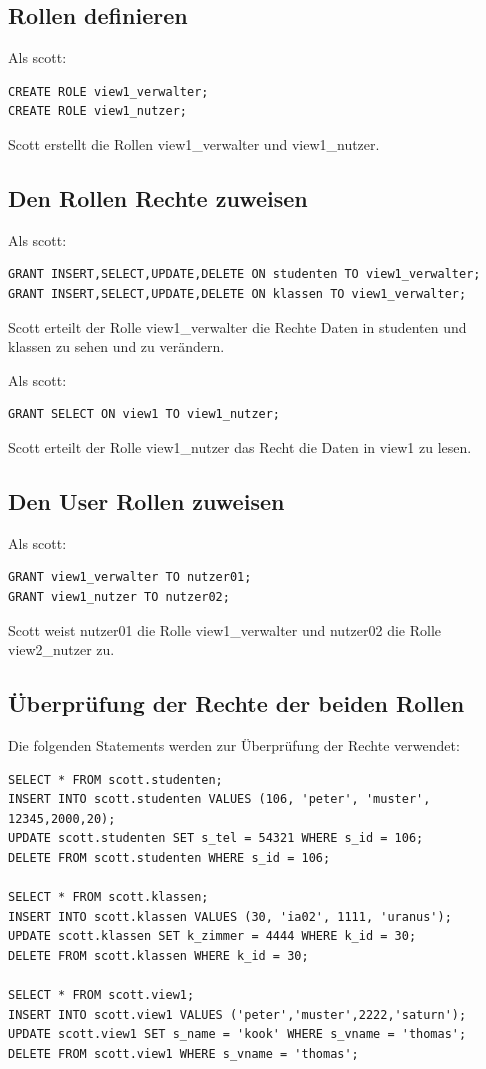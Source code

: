 \documentclass[10pt]{scrreprt}
\begin{document}
\subsection{Rollen definieren}
Als scott:
\begin{lstlisting}[style=sql]
CREATE ROLE view1_verwalter;
CREATE ROLE view1_nutzer;
\end{lstlisting}
Scott erstellt die Rollen view1\_verwalter und view1\_nutzer.
\newpage
\subsection{Den Rollen Rechte zuweisen}
Als scott:
\begin{lstlisting}[style=sql]
GRANT INSERT,SELECT,UPDATE,DELETE ON studenten TO view1_verwalter;
GRANT INSERT,SELECT,UPDATE,DELETE ON klassen TO view1_verwalter;
\end{lstlisting}
Scott erteilt der Rolle view1\_verwalter die Rechte Daten in studenten und klassen zu sehen und zu verändern.

Als scott:
\begin{lstlisting}[style=sql]
GRANT SELECT ON view1 TO view1_nutzer;
\end{lstlisting}
Scott erteilt der Rolle view1\_nutzer das Recht die Daten in view1 zu lesen.

\subsection{Den User Rollen zuweisen}
Als scott:
\begin{lstlisting}[style=sql]
GRANT view1_verwalter TO nutzer01;
GRANT view1_nutzer TO nutzer02;
\end{lstlisting}
Scott weist nutzer01 die Rolle view1\_verwalter und nutzer02 die Rolle view2\_nutzer zu.

\subsection{Überprüfung der Rechte der beiden Rollen}
Die folgenden Statements werden zur Überprüfung der Rechte verwendet:
\begin{lstlisting}[style=sql]
SELECT * FROM scott.studenten;
INSERT INTO scott.studenten VALUES (106, 'peter', 'muster', 12345,2000,20);
UPDATE scott.studenten SET s_tel = 54321 WHERE s_id = 106;
DELETE FROM scott.studenten WHERE s_id = 106;

SELECT * FROM scott.klassen;
INSERT INTO scott.klassen VALUES (30, 'ia02', 1111, 'uranus');
UPDATE scott.klassen SET k_zimmer = 4444 WHERE k_id = 30;
DELETE FROM scott.klassen WHERE k_id = 30;

SELECT * FROM scott.view1;
INSERT INTO scott.view1 VALUES ('peter','muster',2222,'saturn');
UPDATE scott.view1 SET s_name = 'kook' WHERE s_vname = 'thomas';
DELETE FROM scott.view1 WHERE s_vname = 'thomas';
\end{lstlisting}
\end{document}
